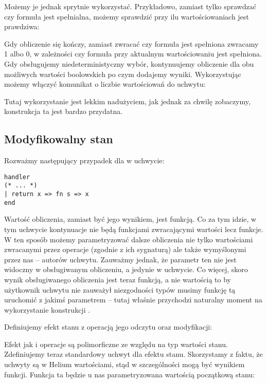 Możemy je jednak sprytnie wykorzystać. Przykładowo, zamiast tylko sprawdzać czy formuła jest spełnialna, możemy sprawdzić przy ilu wartościowaniach jest prawdziwa:



Gdy obliczenie się kończy, zamiast zwracać czy formuła jest spełniona zwracamy 1 albo 0, w zależności czy formuła przy aktualnym wartościowaniu jest spełniona. Gdy obsługujemy niedeterministyczny wybór, kontynuujemy obliczenie dla obu możliwych wartości boolowskich po czym dodajemy wyniki. Wykorzystując  możemy włączyć komunikat o liczbie wartościowań do uchwytu:



Tutaj wykorzystanie  jest lekkim nadużyciem, jak jednak za chwilę zobaczymy, konstrukcja ta jest bardzo przydatna.

\subsection{Modyfikowalny stan}

Rozważmy następujący przypadek dla  w uchwycie:

\begin{lstlisting}
handler
(* ... *)
| return x => fn s => x
end
\end{lstlisting}

Wartość obliczenia, zamiast być jego wynikiem, jest funkcją. Co za tym idzie, w tym uchwycie kontynuacje nie będą funkcjami zwracającymi wartości lecz funkcje. W ten sposób możemy parametryzować dalsze obliczenia nie tylko wartościami zwracanymi przez operacje (zgodnie z ich sygnaturą) ale także wymyślonymi przez nas -- autorów uchwytu. Zauważmy jednak, że parametr ten nie jest widoczny w obsługiwanym obliczeniu, a jedynie w uchwycie. Co więcej, skoro wynik obsługiwanego obliczenia jest teraz funkcją, a nie wartością to by użytkownik uchwytu nie zauważył niezgodności typów musimy funkcję tą uruchomić z jakimś parametrem -- tutaj właśnie przychodzi naturalny moment na wykorzystanie konstrukcji .

Definiujemy efekt stanu z operacją jego odczytu oraz modyfikacji:



Efekt jak i operacje są polimorficzne ze względu na typ wartości stanu. Zdefiniujemy teraz standardowy uchwyt dla efektu stanu. Skorzystamy z faktu, że uchwyty są w Helium wartościami, stąd w szczególności mogą być wynikiem funkcji. Funkcja ta będzie u nas parametryzowana wartością początkową stanu:

